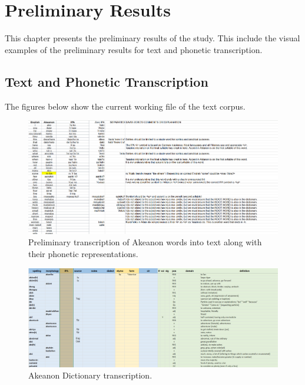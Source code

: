 \chapter{Preliminary Results}
This chapter presents the preliminary results of the study. This include the visual examples of the preliminary results for text and phonetic transcription.

\section{Text and Phonetic Transcription}
\label{sec:TextandPhonetic}

The figures below show the current working file of the text corpus.

\begin{figure}[h!]
	\centering
	\includegraphics[width=\textwidth]{./appendix/prelim_transcription.png}
	\caption{Preliminary transcription of Akeanon words into text along with their phonetic representations.}
	\label{fig:PreliminaryTranscription}
\end{figure}
\label{sec:TextandPhonetic2}

\begin{figure}[h!]
	\centering
	\includegraphics[width=\textwidth]{./appendix/dictionary.png}
	\caption{Akeanon Dictionary transcription.}
	\label{fig:Transcripted Akeanon Dictionary}
\end{figure}
